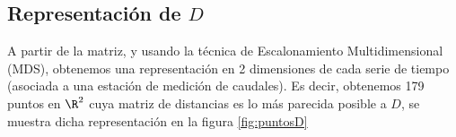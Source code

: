 \documentclass[12pt,oneside]{book}\usepackage[]{graphicx}\usepackage[]{color}
\theoremstyle{definition} %
\begin{document}
% 
% 


\subsection{Representación de $D$}

A partir de la matriz, y usando la técnica de Escalonamiento Multidimensional (MDS), obtenemos una representación en 2 dimensiones de cada serie de tiempo (asociada a una estación de medición de caudales). Es decir, obtenemos 179 puntos en $\R^2$ cuya matriz de distancias es lo más parecida posible a $D$, se muestra dicha representación en la figura \ref{fig:puntosD}
\end{document}
